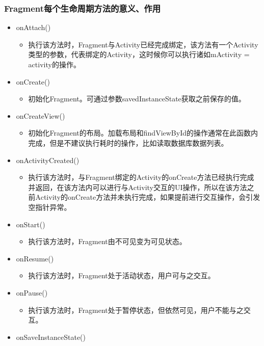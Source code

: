 \documentclass[9pt, b5paper]{article}
\begin{document}
\subsubsection{Fragment每个生命周期方法的意义、作用}
\label{sec-1-2-3}
\begin{itemize}
\item onAttach()
\begin{itemize}
\item 执行该方法时，Fragment与Activity已经完成绑定，该方法有一个Activity类型的参数，代表绑定的Activity，这时候你可以执行诸如mActivity = activity的操作。
\end{itemize}
\item onCreate()
\begin{itemize}
\item 初始化Fragment。可通过参数savedInstanceState获取之前保存的值。
\end{itemize}
\item onCreateView()
\begin{itemize}
\item 初始化Fragment的布局。加载布局和findViewById的操作通常在此函数内完成，但是不建议执行耗时的操作，比如读取数据库数据列表。
\end{itemize}
\item onActivityCreated()
\begin{itemize}
\item 执行该方法时，与Fragment绑定的Activity的onCreate方法已经执行完成并返回，在该方法内可以进行与Activity交互的UI操作，所以在该方法之前Activity的onCreate方法并未执行完成，如果提前进行交互操作，会引发空指针异常。
\end{itemize}
\item onStart()
\begin{itemize}
\item 执行该方法时，Fragment由不可见变为可见状态。
\end{itemize}
\item onResume()
\begin{itemize}
\item 执行该方法时，Fragment处于活动状态，用户可与之交互。
\end{itemize}
\item onPause()
\begin{itemize}
\item 执行该方法时，Fragment处于暂停状态，但依然可见，用户不能与之交互。
\end{itemize}
\item onSaveInstanceState()
\begin{itemize}

\end{itemize}
\end{itemize}
\end{document}
